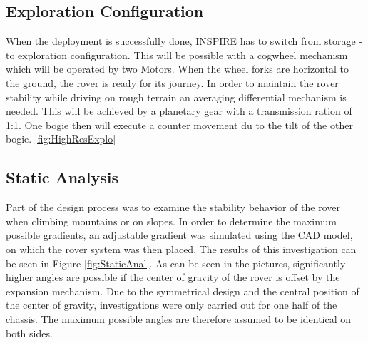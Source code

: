 \subsection{Exploration Configuration}

When the deployment is successfully done, INSPIRE has to switch from storage - to exploration configuration.
This will be possible with a cogwheel mechanism which will be operated by two Motors. When the wheel forks are horizontal to the ground, the rover is ready for its journey.
In order to maintain the rover stability while driving on rough terrain an averaging differential mechanism is needed.
This will be achieved by a planetary gear with a transmission ration of 1:1.
One bogie then will execute a counter movement du to the tilt of the other bogie.
\autoref{fig:HighResExplo}

\subsection{Static Analysis}

Part of the design process was to examine the stability behavior of the rover when climbing mountains or on slopes. In order to determine the maximum possible gradients, an adjustable gradient was simulated using the CAD model, on which the rover system was then placed. The results of this investigation can be seen in Figure \autoref{fig:StaticAnal}. As can be seen in the pictures, significantly higher angles are possible if the center of gravity of the rover is offset by the expansion mechanism. 
Due to the symmetrical design and the central position of the center of gravity, investigations were only carried out for one half of the chassis. The maximum possible angles are therefore assumed to be identical on both sides. 

